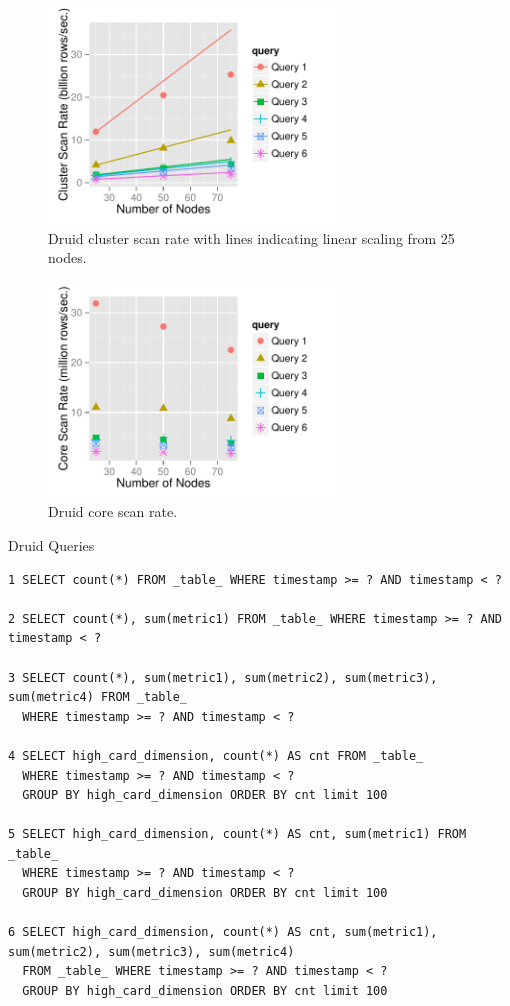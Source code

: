 \documentclass{vldb}
\begin{document}
\begin{figure}
\centering
\includegraphics[width = 3in]{cluster_scan_rate}
\caption{Druid cluster scan rate with lines indicating linear scaling
  from 25 nodes.}
\label{fig:cluster_scan_rate}
\end{figure}

\begin{figure}
\centering
\includegraphics[width = 3in]{core_scan_rate}
\caption{Druid core scan rate.}
\label{fig:core_scan_rate}
\end{figure}

\begin{table}
  \centering
  \caption{Druid Queries}
  \label{tab:sql_queries}
\begin{verbatim}
1 SELECT count(*) FROM _table_ WHERE timestamp >= ? AND timestamp < ?

2 SELECT count(*), sum(metric1) FROM _table_ WHERE timestamp >= ? AND timestamp < ?

3 SELECT count(*), sum(metric1), sum(metric2), sum(metric3), sum(metric4) FROM _table_
  WHERE timestamp >= ? AND timestamp < ?

4 SELECT high_card_dimension, count(*) AS cnt FROM _table_
  WHERE timestamp >= ? AND timestamp < ?
  GROUP BY high_card_dimension ORDER BY cnt limit 100

5 SELECT high_card_dimension, count(*) AS cnt, sum(metric1) FROM _table_
  WHERE timestamp >= ? AND timestamp < ?
  GROUP BY high_card_dimension ORDER BY cnt limit 100

6 SELECT high_card_dimension, count(*) AS cnt, sum(metric1), sum(metric2), sum(metric3), sum(metric4)
  FROM _table_ WHERE timestamp >= ? AND timestamp < ?
  GROUP BY high_card_dimension ORDER BY cnt limit 100
\end{verbatim}
\end{table}
\end{document}

